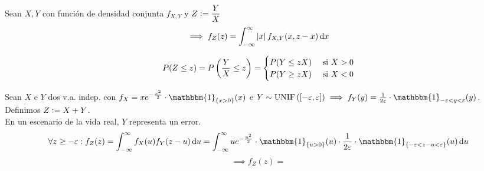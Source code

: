  Sean $X, Y$ con función de densidad conjunta $f_{X, Y}$ y $\displaystyle Z\vcentcolon= \frac{Y}{X}$
\[\implies f_{Z}(z) = \int_{-\infty}^{\infty} \abs{x} f_{X, Y} (x, z-x) \odif{x}\]
\begin{dem}
	\[P(Z\leq z) = P\left(\frac{Y}{X} \leq z\right) = \begin{cases}
			P(Y \leq zX) & \text{ si } X > 0 \\
			P(Y \geq zX) & \text{ si } X < 0
		\end{cases}\]

\end{dem}

 Sean $X$ e $Y$ dos v.a. indep. con $\ds f_X = xe^{-\frac{x^2}{2}} \cdot \mathbbm{1}_{\{x>0\}}(x)$ e $Y\sim\unif{[-\varepsilon,\varepsilon]} \implies f_Y(y) =\frac{1}{2\varepsilon} \cdot \mathbbm{1}_{-\varepsilon<y<\varepsilon}(y)$. Definimos $Z\vcentcolon= X+Y$. \\
\hfill {} En un escenario de la vida real, $Y$ representa un error.
\[\forall z \geq -\varepsilon : f_Z(z) = \int_{-\infty}^{\infty} f_X(u) f_Y(z-u)\odif{u} = \int_{-\infty}^{\infty} ue^{-\frac{u^2}{2}} \cdot \mathbbm{1}_{\{u>0\}}(u)\cdot \frac{1}{2\varepsilon} \cdot \mathbbm{1}_{\{-\varepsilon<z-u<\varepsilon\}} (u) \odif{u}\]
\[\implies f_Z(z) = \]
